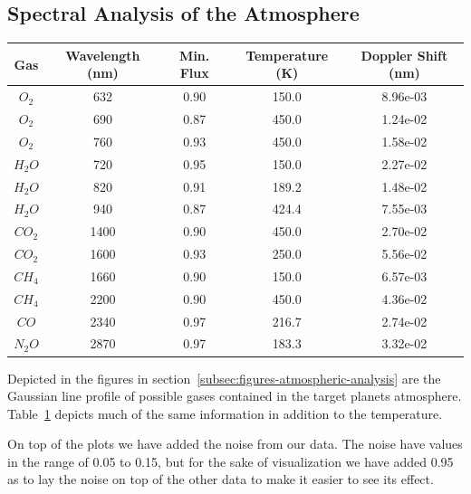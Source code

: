 \documentclass[reprint,english,notitlepage]{revtex4-2}
\begin{document}
\subsection{Spectral Analysis of the Atmosphere} \label{ssec: Analysis results}
\begin{table}[h!] \label{tab: Spec anal}
  \begin{tabular}{|c|*{4}{c|}}    
    \hline
    Gas  &Wavelength (nm) &Min. Flux &Temperature (K) &Doppler Shift (nm) \\
    \hline
    $ O_{2} $ &632 &0.90 &150.0 &8.96e-03 \\
    \hline
    $ O_{2} $ &690 &0.87 &450.0 &1.24e-02 \\
    \hline
    $ O_{2} $ &760 &0.93 &450.0 &1.58e-02 \\
    \hline
    $ H_{2}O $ &720 &0.95 &150.0 &2.27e-02 \\
    \hline
    $ H_{2}O $ &820 &0.91 &189.2 &1.48e-02 \\
    \hline
    $ H_{2} O$ &940 &0.87 &424.4 &7.55e-03 \\
    \hline
    $ CO_{2} $ &1400 &0.90 &450.0 &2.70e-02 \\
    \hline
    $ CO_{2} $ &1600 &0.93 &250.0 &5.56e-02 \\
    \hline
    $ CH_{4} $ &1660 &0.90 &150.0 &6.57e-03 \\
    \hline
    $ CH_{4} $ &2200 &0.90 &450.0 &4.36e-02 \\
    \hline
    $ CO $ &2340 &0.97 &216.7 &2.74e-02 \\
    \hline
    $ N_{2}O $ &2870 &0.97 &183.3 &3.32e-02 \\
    \hline
    \end{tabular}
  \end{table}
  \newpage
\twocolumngrid
Depicted in the figures in section~\ref{subsec:figures-atmospheric-analysis} are the Gaussian line profile of possible gases contained in the target planets atmosphere.
Table~\ref{tab: Spec anal} depicts much of the same information in addition to the temperature.

On top of the plots we have added the noise from our data.
The noise have values in the range of 0.05 to 0.15, but for the sake of visualization we have added 0.95 as to lay the noise on top of the other data to make it easier to see its effect.
\end{document}
